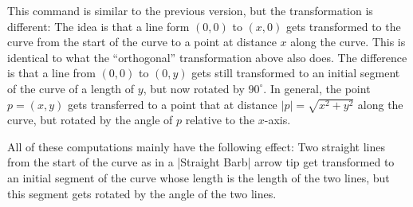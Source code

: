 \begin{command}{\pgfpointcurvilinearbezierpolar{}}
    This command is similar to the previous version, but the transformation is
    different: The idea is that a line form $(0,0)$ to $(x,0)$ gets transformed
    to the curve from the start of the curve to a point at distance $x$ along
    the curve. This is identical to what the ``orthogonal'' transformation
    above also does. The difference is that a line from $(0,0)$ to $(0,y)$ gets
    still transformed to an initial segment of the curve of a length of $y$,
    but now rotated by $90^\circ$. In general, the point $p = (x,y)$ gets
    transferred to a point that at distance $|p| = \sqrt{x^2+y^2}$ along the
    curve, but rotated by the angle of $p$ relative to the $x$-axis.

    All of these computations mainly have the following effect: Two straight
    lines from the start of the curve as in a |Straight Barb| arrow tip get
    transformed to an initial segment of the curve whose length is the length
    of the two lines, but this segment gets rotated by the angle of the two
    lines.
\makeatletter
\begin{codeexample}[
    preamble={\usepgfmodule{nonlineartransformations}
\usetikzlibrary{curvilinear}},
    pre=\makeatletter]
\end{codeexample}

\begin{codeexample}[
    preamble={\usepgfmodule{nonlineartransformations}
\usetikzlibrary{curvilinear}},
    pre=\makeatletter]
\end{codeexample}
\end{command}



